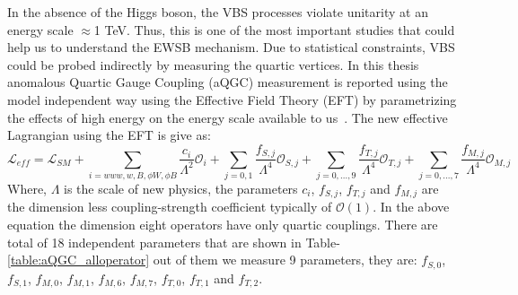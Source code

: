 In the absence of the Higgs boson, the VBS processes violate unitarity at an energy scale $\approx$1 TeV. Thus, this is one of the most important studies that could help us to understand the EWSB mechanism. Due to statistical constraints, VBS could be probed indirectly by measuring the quartic vertices. In this thesis anomalous Quartic Gauge Coupling (aQGC) measurement is reported using the model independent way using the Effective Field Theory (EFT) by parametrizing the effects of high energy on the energy scale available to us~\cite{aqgc_operators}. The new effective Lagrangian using the EFT is give as:
\begin{equation}
	\mathcal{L}_{eff} = \mathcal{L}_{SM} + \sum_{i=www,w,B, \phi W, \phi B} \frac{c_i}{\Lambda^2} {\mathcal{O}}_i + \sum_{j=0,1}\frac{f_{S,j}}{\Lambda^4} \mathcal{O}_{S,j} + \sum_{j=0,...,9}\frac{f_{T,j}}{\Lambda^4} \mathcal{O}_{T,j}  + \sum_{j=0,...,7} \frac{f_{M,j}}{\Lambda^4} \mathcal{O}_{M,j}
\end{equation}
Where, $\Lambda$ is the scale of new physics, the parameters $c_i$, $f_{S,j}$, $f_{T,j}$ and $f_{M,j}$ are the dimension less coupling-strength coefficient typically of $\mathcal{O}(1)$. In the above equation the dimension eight operators have only quartic couplings. There are total of 18 independent parameters that are shown in Table-\ref{table:aQGC_alloperator} out of them we measure 9 parameters, they are: $f_{S,0}$, $f_{S,1}$, $f_{M,0}$, $f_{M,1}$, $f_{M,6}$, $f_{M,7}$, $f_{T,0}$, $f_{T,1}$ and $f_{T,2}$. 
